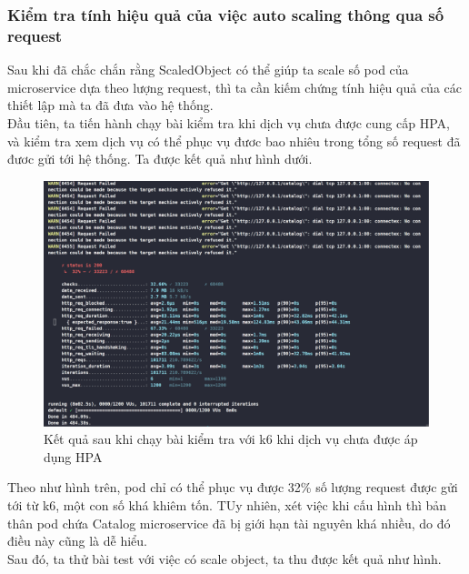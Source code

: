\subsubsection{Kiểm tra tính hiệu quả của việc auto scaling thông qua số request}
\noindent Sau khi đã chắc chắn rằng ScaledObject có thể giúp ta scale số pod của microservice dựa theo lượng request, thì ta cần kiếm chứng tính hiệu quả của các thiết lập mà ta đã đưa vào hệ thống.\\[0.5cm]
Đầu tiên, ta tiến hành chạy bài kiểm tra khi dịch vụ chưa được cung cấp HPA, và kiểm tra xem dịch vụ có thể phục vụ đươc bao nhiêu trong tổng số request đã đươc gửi tới hệ thống. Ta được kết quả như hình dưới.
\begin{figure}[H]
  \begin{center}
    \includegraphics[scale=0.44]{images/hanh/test-without-hpa.png}
    \caption{Kết quả sau khi chạy bài kiểm tra với k6 khi dịch vụ chưa được áp dụng HPA}
  \end{center}
  \label{}
\end{figure}
Theo như hình trên, pod chỉ có thể phục vụ được 32\% số lượng request được gửi tới từ k6, một con số khá khiêm tốn. TUy nhiên, xét việc khi cấu hình thì bản thân pod chứa Catalog microservice đã bị giới hạn tài nguyên khá nhiều, do đó điều này cũng là dễ hiểu.\\[0.5cm]
Sau đó, ta thử bài test với việc có scale object, ta thu được kết quả như hình.

